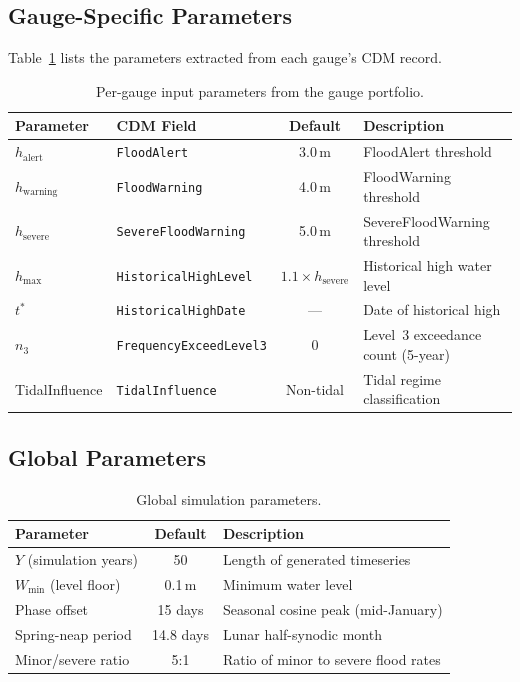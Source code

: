 \documentclass[11pt,a4paper]{article}
\begin{document}
\subsection{Gauge-Specific Parameters}

Table~\ref{tab:gauge_params} lists the parameters extracted from each gauge's CDM record.

\begin{table}[H]
    \centering
    \caption{Per-gauge input parameters from the gauge portfolio.}
    \label{tab:gauge_params}
    \begin{tabular}{llcl}
        \toprule
        \textbf{Parameter} & \textbf{CDM Field} & \textbf{Default} & \textbf{Description} \\
        \midrule
        $h_{\text{alert}}$
            & \texttt{FloodAlert} & 3.0\,m
            & FloodAlert threshold \\
        $h_{\text{warning}}$
            & \texttt{FloodWarning} & 4.0\,m
            & FloodWarning threshold \\
        $h_{\text{severe}}$
            & \texttt{SevereFloodWarning} & 5.0\,m
            & SevereFloodWarning threshold \\
        $h_{\text{max}}$
            & \texttt{HistoricalHighLevel} & $1.1 \times h_{\text{severe}}$
            & Historical high water level \\
        $t^*$
            & \texttt{HistoricalHighDate} & ---
            & Date of historical high \\
        $n_3$
            & \texttt{FrequencyExceedLevel3} & 0
            & Level~3 exceedance count (5-year) \\
        TidalInfluence
            & \texttt{TidalInfluence} & Non-tidal
            & Tidal regime classification \\
        \bottomrule
    \end{tabular}
\end{table}

\subsection{Global Parameters}

\begin{table}[H]
    \centering
    \caption{Global simulation parameters.}
    \label{tab:global_params}
    \begin{tabular}{lcl}
        \toprule
        \textbf{Parameter} & \textbf{Default} & \textbf{Description} \\
        \midrule
        $Y$ (simulation years) & 50 & Length of generated timeseries \\
        $W_{\min}$ (level floor) & 0.1\,m & Minimum water level \\
        Phase offset & 15 days & Seasonal cosine peak (mid-January) \\
        Spring-neap period & 14.8 days & Lunar half-synodic month \\
        Minor/severe ratio & 5:1 & Ratio of minor to severe flood rates \\
        \bottomrule
    \end{tabular}
\end{table}
\end{document}
